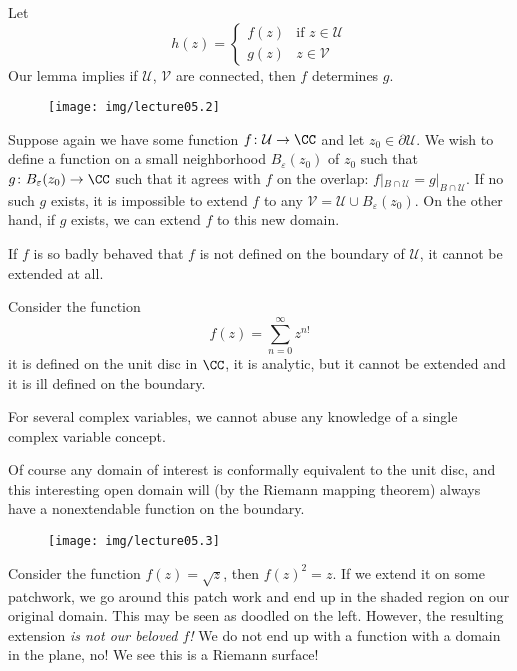 Let
\begin{equation}
h(z)=\begin{cases} f(z) & \mbox{if }z\in\mathcal{U}\\
g(z) & z\in\mathcal{V}
\end{cases}
\end{equation}
Our lemma implies if $\mathcal{U}$, $\mathcal{V}$ are connected,
then $f$ determines $g$.

\begin{wrapfigure}{l}{2in}
\vspace{-20pt}
\begin{center}
\texttt{[image: img/lecture05.2]}
\end{center}
\vspace{-20pt}
\end{wrapfigure}
Suppose again we have some function $f\colon\mathcal{U}\to\CC$
and let $z_{0}\in\partial\mathcal{U}$. We wish to define a function on a
small neighborhood $B_{\varepsilon}(z_{0})$ of $z_{0}$ such that
$g\colon B_{\varepsilon}(z_{0})\to\CC$ such that it agrees with
$f$ on the overlap:
$f|_{B\cap\mathcal{U}}=g|_{B\cap\mathcal{U}}$. If no such $g$
exists, it is impossible to extend $f$ to any
$\mathcal{V}=\mathcal{U}\cup B_{\varepsilon}(z_{0})$. On the
other hand, if $g$ exists, we can extend $f$ to this new domain. 

If $f$ is so badly behaved that $f$ is not defined on the
boundary of $\mathcal{U}$, it cannot be extended at all.

\begin{ex}
Consider the function
\begin{equation}
f(z)=\sum^{\infty}_{n=0}z^{n!}
\end{equation}
it is defined on the unit disc in $\CC$, it is analytic, but it
cannot be extended and it is ill defined on the boundary.
\end{ex}
\begin{rmk}
For several complex variables, we cannot abuse any knowledge of a
single complex variable concept.
\end{rmk}

Of course any domain of interest is conformally equivalent to
the unit disc, and this interesting open domain will (by the
Riemann mapping theorem) always have a nonextendable function on
the boundary. 

\begin{wrapfigure}{l}{2in}
\vspace{-20pt}
\begin{center}
\texttt{[image: img/lecture05.3]}
\end{center}
\vspace{-30pt}
\end{wrapfigure}
\noindent{}Consider the function $f(z)=\sqrt{z}$, then
$f(z)^{2}=z$. If we extend it on some patchwork, we go around
this patch work and end up in the shaded region on our original
domain. This may be seen as doodled on the left. However, the
resulting extension \emph{is not our beloved $f$!} We do not end
up with a function with a domain in the plane, no! We see this is
a Riemann surface!

